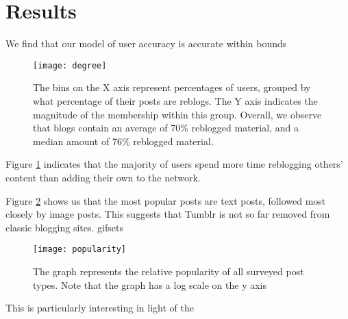 \section{Results}
\label{sec:-res}
We find that our model of user accuracy is accurate within bounds

\begin{figure}[bht]
\centering
 \texttt{[image: degree]}
  \caption{The bins on the X axis represent percentages of users, grouped by what percentage of their posts are reblogs.  The Y axis indicates the magnitude of the membership within this group.  Overall, we observe that blogs contain an average of 70\% reblogged material, and a median amount of 76\% reblogged material.}
  \label{fig:-deg}
\end{figure}

Figure \ref{fig:-deg} indicates that the majority of users spend more 
time reblogging others' content than adding their own to the network.


Figure \ref{fig:-pop} shows us that the most popular posts are text 
posts, followed most closely by image posts.  This suggests that Tumblr 
is not so far removed from classic blogging sites.
gifsets\cite{hillman2014tumblr}

\begin{figure}[bht]
\centering
 \texttt{[image: popularity]}
  \caption{The graph represents the relative popularity of all surveyed post types.  Note that the graph has a log scale on the y axis}
  \label{fig:-pop}
\end{figure}
This is particularly interesting in light of the 

